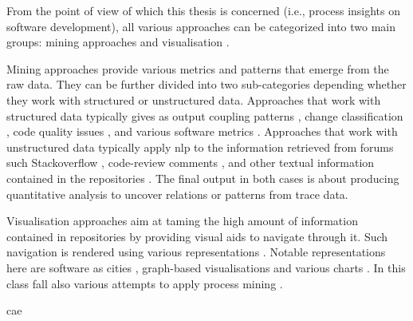 From the point of view of which this thesis is concerned (i.e., process insights on software development), all various approaches can be categorized into two main groups: mining approaches and visualisation . 

Mining approaches provide various metrics and patterns that emerge from the raw data. They can be further divided into two sub-categories depending whether they work with structured or unstructured data. Approaches that work with structured data typically gives as output coupling patterns \citep{DBLP:conf/msr/SouzaM13,DBLP:journals/smr/KirbasCHCBSB17,DBLP:journals/ese/WenNLB22}, change classification \citep{kaur2018gcc,DBLP:journals/ese/HerzigJZ16}, code quality issues \citep{DBLP:conf/msr/KieferBT07,DBLP:conf/msr/ChenTNH12,DBLP:conf/icse/WangLT16}, and various software metrics \citep{DBLP:conf/icst/ZaidmanRDD08,DBLP:conf/icse/Thomas11,DBLP:conf/scam/SokolAG13}. Approaches that work with unstructured data typically apply \gls{nlp} to the information retrieved from forums such Stackoverflow \citep{DBLP:conf/msr/PonzanelliBPOL14}, code-review comments \citep{DBLP:conf/msr/OmranT17}, and other textual information contained in the repositories \citep{DBLP:journals/ese/BaruaTH14,DBLP:journals/jss/YanFZYXK16}. The final output in both cases is about producing quantitative analysis to uncover relations or patterns from trace data.

Visualisation approaches aim at taming the high amount of information contained in repositories by providing visual aids to navigate through it. Such navigation is rendered using various representations \citep{DBLP:journals/scp/TorresGSP16}. Notable representations here are software as cities \cite{DBLP:conf/vissoft/WettelL07} , graph-based visualisations \cite{DBLP:conf/icse/BhattacharyaINF12} and various charts \cite{DAmbros2009,DBLP:conf/msr/BirdGDGS06}. In this class fall also various attempts to apply process mining \cite{rubin2014process, DBLP:conf/indiaSE/GuptaS14,DBLP:conf/wecwis/MarquesSF18,DBLP:conf/bpm/JookenCJ19}. 

%
cae%

% 

